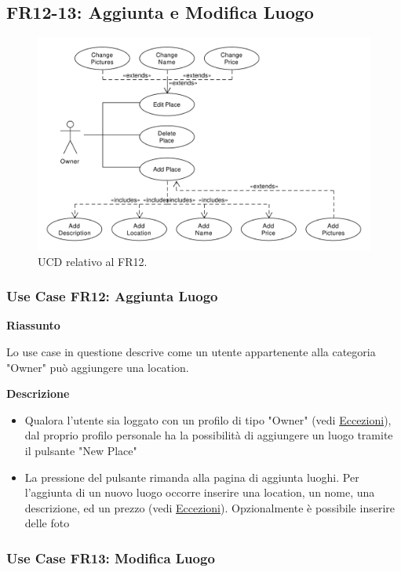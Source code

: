 \documentclass[9pt]{extarticle}
\begin{document}
\subsection{FR12-13: Aggiunta e Modifica Luogo}


\begin{figure}[!htb]
	\centering
	\includegraphics[width=\linewidth]{./images/FR12.pdf}
	\caption{UCD relativo al FR12.}
	\label{fig:UCD_FR12}
\end{figure}

\subsubsection*{Use Case FR12: Aggiunta Luogo}

\textbf{Riassunto}

Lo use case in questione descrive come un utente appartenente alla categoria "Owner" può aggiungere una location.

\textbf{Descrizione}

\begin{itemize}
	\item Qualora l'utente sia loggato con un profilo di tipo "Owner" (vedi \hyperref[Eccezioni-FR12-13]{Eccezioni}), dal proprio profilo personale ha la possibilità di aggiungere un luogo tramite il pulsante "New Place"
	\item La pressione del pulsante rimanda alla pagina di aggiunta luoghi. Per l'aggiunta di un nuovo luogo occorre inserire una location, un nome, una descrizione, ed un prezzo (vedi \hyperref[Eccezioni-FR12-13]{Eccezioni}). Opzionalmente è possibile inserire delle foto
\end{itemize}

\subsubsection*{Use Case FR13: Modifica Luogo}
\end{document}
